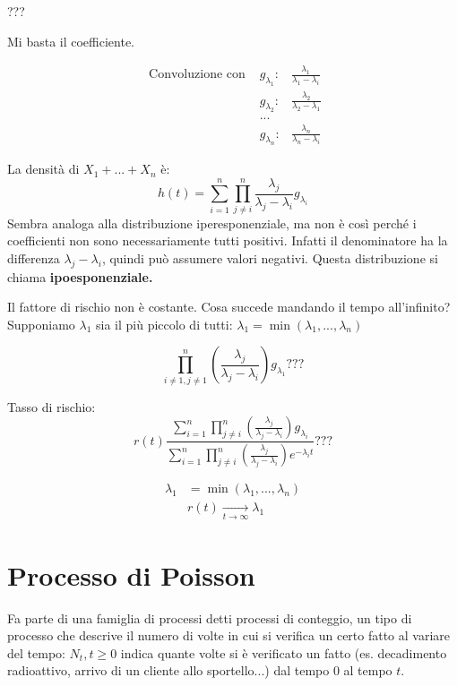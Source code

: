 \documentclass[a4paper,12pt]{book}
\begin{document}
??? %

Mi basta il coefficiente. 

$$ \begin{array}{ccc} %
 \text{ Convoluzione con } & g_{\lambda_1}: & \frac{\lambda_1}{\lambda_1 - \lambda_i} \\
 & g_{\lambda_2} : & \frac{\lambda_2}{\lambda_2  - \lambda_1} \\
 & ... & \\
 & g_{\lambda_n}: & \frac{\lambda_n}{\lambda_n - \lambda_i}
\end{array}$$


La densità di $ X_1 + ... + X_n $ è:
$$ h(t) = \sum_{i = 1}^n \prod_{j \ne i}^{n} \frac{\lambda_j}{\lambda_j - \lambda_i} g_{\lambda_i}$$
Sembra analoga alla distribuzione iperesponenziale, ma non è così perché i coefficienti non sono necessariamente tutti positivi. Infatti il denominatore ha la differenza $ \lambda_j - \lambda_i $, quindi può assumere valori negativi. Questa distribuzione si chiama \textbf{ipoesponenziale.} %

Il fattore di rischio non è costante. Cosa succede mandando il tempo all'infinito? Supponiamo $\lambda_1$ sia il più piccolo di tutti: $\lambda_1 = \min(\lambda_1, ..., \lambda_n)$

$$ \prod_{i \ne 1, j\ne 1}^{n} \left(\frac{\lambda_j}{\lambda_j - \lambda_i}\right) g_{\lambda_1} ??? $$ %

Tasso di rischio:
$$ r(t) \frac{\sum_{i=1}^{n}\prod_{j\ne i}^{n} \left(\frac{\lambda_j}{\lambda_j - \lambda_i}\right)g_{\lambda_i}}{\sum_{i=1}^{n}\prod_{j\ne i}^{n} \left(\frac{\lambda_j}{\lambda_j - \lambda_i}\right) e^{-\lambda_i t}} ??? $$%

\begin{align*}
	\lambda_1 & = \min(\lambda_1, ..., \lambda_n) \\
	& r(t) \underset{t \to \infty}{\longrightarrow} \lambda_1
\end{align*}

\section{Processo di Poisson}
Fa parte di una famiglia di processi detti processi di conteggio, un tipo di processo che descrive il numero di volte in cui si verifica un certo fatto al variare del tempo: $ N_t, t \ge 0 $ indica quante volte si è verificato un fatto (es. decadimento radioattivo, arrivo di un cliente allo sportello...) dal tempo 0 al tempo $ t $.
\end{document}
